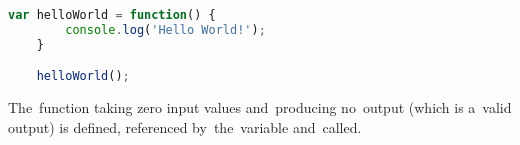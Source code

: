 \begin{lstlisting}[language=JavaScript]
    var helloWorld = function() {
        console.log('Hello World!');
    }

    helloWorld();
\end{lstlisting}

\noindent The~function taking zero input values and~producing no~output (which is a~valid output) is defined, referenced by~the~variable and~called.
